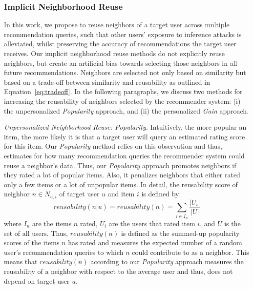 \documentclass[manuscript,review,anonymous]{acmart}
\begin{document}
\subsubsection{Implicit Neighborhood Reuse}
\label{subsubsec:implicitreuse}
In this work, we propose to reuse neighbors of a target user across multiple recommendation queries, such that other users' exposure to inference attacks is alleviated, whilst preserving the accuracy of recommendations the target user receives.
Our implicit neighborhood reuse methods do not explicitly reuse neighbors, but create an artificial bias towards selecting those neighbors in all future recommendations.
Neighbors are selected not only based on similarity but based on a trade-off between similarity and reusability as outlined in Equation~\ref{eq:tradeoff}.
In the following paragraphs, we discuss two methods for increasing the reusability of neighbors selected by the recommender system: (i) the unpersonalized \emph{Popularity} approach, and (ii) the personalized \emph{Gain} approach.

\vspace{2mm} \noindent \emph{Unpersonalized Neighborhood Reuse: Popularity.}
Intuitively, the more popular an item, the more likely it is that a target user will query an estimated rating score for this item.
Our \emph{Popularity} method relies on this observation and thus, estimates for how many recommendation queries the recommender system could reuse a neighbor's data.
Thus, our \emph{Popularity} approach promotes neighbors if they rated a lot of popular items.
Also, it penalizes neighbors that either rated only a few items or a lot of unpopular items. 
In detail, the reusability score of neighbor $n \in N_{u, i}$ of target user $u$ and item $i$ is defined by:
\begin{equation}
    reusability(n|u) = reusability(n) = \sum_{i \in I_n} \frac{|U_i|}{|U|} \label{eq:popularity}
\end{equation}
where $I_n$ are the items $n$ rated, $U_i$ are the users that rated item $i$, and $U$ is the set of all users.
Thus, $reusability(n)$ is defined as the summed-up popularity scores of the items $n$ has rated and measures the expected number of a random user's recommendation queries to which $n$ could contribute to as a neighbor. 
This means that $reusability(n)$ according to our \emph{Popularity} approach measures the reusability of a neighbor with respect to the average user and thus, does not depend on target user $u$. 
\end{document}
